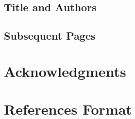 \documentclass{sigchi}
\begin{document}
\subsection{Title and Authors}

\subsection{Subsequent Pages}


\section{Acknowledgments}

\section{References Format}

\balance{}



\end{document}
